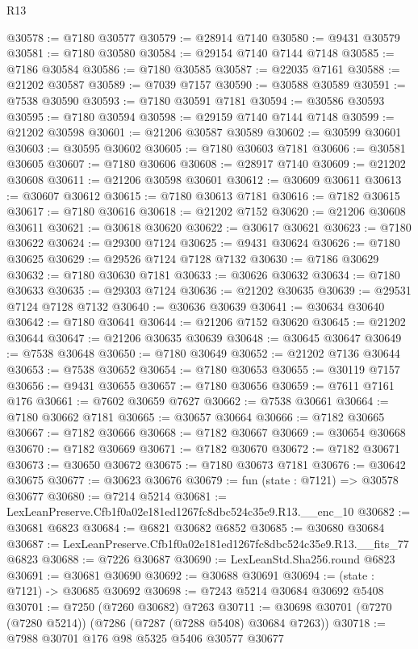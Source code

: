 \begin{lexlean}{R13}
\begin{coremodule}
@30578 := @7180 @30577
@30579 := @28914 @7140
@30580 := @9431 @30579
@30581 := @7180 @30580
@30584 := @29154 @7140 @7144 @7148
@30585 := @7186 @30584
@30586 := @7180 @30585
@30587 := @22035 @7161
@30588 := @21202 @30587
@30589 := @7039 @7157
@30590 := @30588 @30589
@30591 := @7538 @30590
@30593 := @7180 @30591 @7181
@30594 := @30586 @30593
@30595 := @7180 @30594
@30598 := @29159 @7140 @7144 @7148
@30599 := @21202 @30598
@30601 := @21206 @30587 @30589
@30602 := @30599 @30601
@30603 := @30595 @30602
@30605 := @7180 @30603 @7181
@30606 := @30581 @30605
@30607 := @7180 @30606
@30608 := @28917 @7140
@30609 := @21202 @30608
@30611 := @21206 @30598 @30601
@30612 := @30609 @30611
@30613 := @30607 @30612
@30615 := @7180 @30613 @7181
@30616 := @7182 @30615
@30617 := @7180 @30616
@30618 := @21202 @7152
@30620 := @21206 @30608 @30611
@30621 := @30618 @30620
@30622 := @30617 @30621
@30623 := @7180 @30622
@30624 := @29300 @7124
@30625 := @9431 @30624
@30626 := @7180 @30625
@30629 := @29526 @7124 @7128 @7132
@30630 := @7186 @30629
@30632 := @7180 @30630 @7181
@30633 := @30626 @30632
@30634 := @7180 @30633
@30635 := @29303 @7124
@30636 := @21202 @30635
@30639 := @29531 @7124 @7128 @7132
@30640 := @30636 @30639
@30641 := @30634 @30640
@30642 := @7180 @30641
@30644 := @21206 @7152 @30620
@30645 := @21202 @30644
@30647 := @21206 @30635 @30639
@30648 := @30645 @30647
@30649 := @7538 @30648
@30650 := @7180 @30649
@30652 := @21202 @7136 @30644
@30653 := @7538 @30652
@30654 := @7180 @30653
@30655 := @30119 @7157
@30656 := @9431 @30655
@30657 := @7180 @30656
@30659 := @7611 @7161 @176
@30661 := @7602 @30659 @7627
@30662 := @7538 @30661
@30664 := @7180 @30662 @7181
@30665 := @30657 @30664
@30666 := @7182 @30665
@30667 := @7182 @30666
@30668 := @7182 @30667
@30669 := @30654 @30668
@30670 := @7182 @30669
@30671 := @7182 @30670
@30672 := @7182 @30671
@30673 := @30650 @30672
@30675 := @7180 @30673 @7181
@30676 := @30642 @30675
@30677 := @30623 @30676
@30679 := fun (state : @7121) => @30578 @30677
@30680 := @7214 @5214
@30681 := LexLeanPreserve.Cfb1f0a02e181ed1267fc8dbc524c35e9.R13.__enc_10
@30682 := @30681 @6823
@30684 := @6821 @30682 @6852
@30685 := @30680 @30684
@30687 := LexLeanPreserve.Cfb1f0a02e181ed1267fc8dbc524c35e9.R13.__fits_77 @6823
@30688 := @7226 @30687
@30690 := LexLeanStd.Sha256.round @6823
@30691 := @30681 @30690
@30692 := @30688 @30691
@30694 := (state : @7121) -> @30685 @30692
@30698 := @7243 @5214 @30684 @30692 @5408
@30701 := @7250 (@7260 @30682) @7263
@30711 := @30698 @30701 (@7270 (@7280 @5214)) (@7286 (@7287 (@7288 @5408) @30684 @7263))
@30718 := @7988 @30701 @176 @98 @5325 @5406 @30577 @30677

\end{coremodule}
\end{lexlean}
